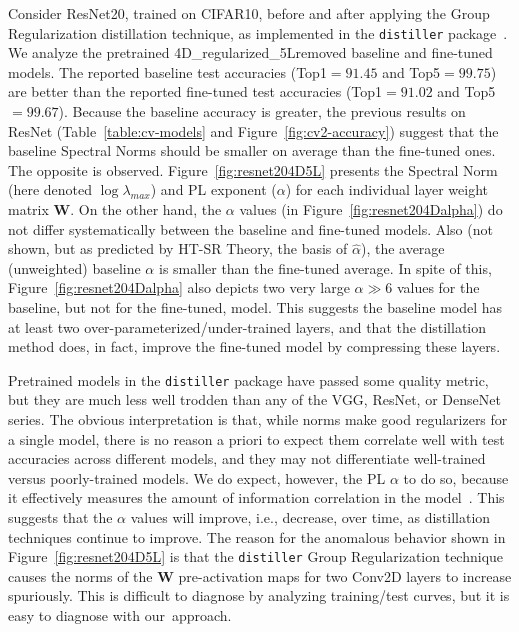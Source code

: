 Consider ResNet20, trained on CIFAR10, before and after applying the Group Regularization distillation technique, as implemented in the \texttt{distiller} package~\cite{distiller}.
We analyze the pretrained 4D\_regularized\_5Lremoved baseline and fine-tuned models. 
The reported baseline test accuracies (Top1$=91.45$ and Top5$=99.75$) are better than the reported fine-tuned test accuracies (Top1$=91.02$ and Top5$=99.67$).  
Because the baseline accuracy is greater,  the previous results on ResNet (Table~\ref{table:cv-models} and Figure~\ref{fig:cv2-accuracy}) suggest that the baseline Spectral Norms should be smaller on average than the fine-tuned ones.
The opposite is observed.
Figure~\ref{fig:resnet204D5L} presents the Spectral Norm (here denoted $\log\lambda_{max}$) and PL exponent ($\alpha$) for each individual layer weight matrix $\mathbf{W}$.
On the other hand, the $\alpha$ values (in Figure~\ref{fig:resnet204Dalpha}) do not differ systematically between the baseline and fine-tuned models.
Also (not shown, but as predicted by HT-SR Theory, the basis of $\hat{\alpha}$), the average (unweighted) baseline $\alpha$ is smaller than the fine-tuned average.
%
In spite of this, Figure~\ref{fig:resnet204Dalpha} also depicts two very large $\alpha\gg 6$ values for the baseline, but not for the fine-tuned, model.
This suggests the baseline model has at least two over-parameterized/under-trained layers, and that the distillation method does, in fact, improve the fine-tuned model by compressing these layers.

Pretrained models in the \texttt{distiller} package have passed some quality metric, but they are much less well trodden than any of the VGG, ResNet, or DenseNet series.  
The obvious interpretation is that, while norms make good regularizers for a single model, there is no reason a priori to expect them correlate well with test accuracies across different models, and they may not differentiate well-trained versus poorly-trained models.
We do expect, however, the PL $\alpha$ to do so, because it effectively measures the amount of information correlation in the model~\cite{MM18_TR, MM19_HTSR_ICML, MM20_SDM}.
This suggests that the $\alpha$ values will improve, i.e., decrease, over time, as distillation techniques continue to improve.
The reason for the anomalous behavior shown in 
Figure~\ref{fig:resnet204D5L}
is that the \texttt{distiller} Group Regularization technique 
causes the norms of the $\mathbf{W}$ pre-activation maps for two Conv2D layers to increase spuriously.
This is difficult to diagnose by analyzing training/test curves, but it is easy to diagnose with our~approach.


